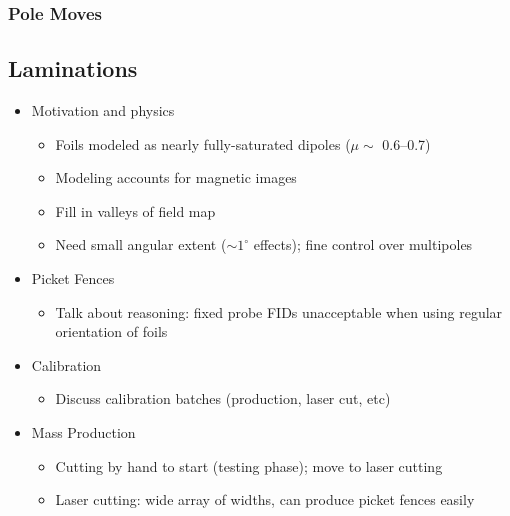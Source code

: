 \subsubsection{Pole Moves}

\subsection{Laminations}

\begin{itemize}
   \item Motivation and physics 
         \begin{itemize}
            \item Foils modeled as nearly fully-saturated dipoles ($\mu \sim$ 0.6--0.7) 
            \item Modeling accounts for magnetic images  
            \item Fill in valleys of field map 
            \item Need small angular extent ($\sim 1^{\circ}$ effects); fine control over multipoles 
         \end{itemize}  
   \item Picket Fences 
         \begin{itemize}
            \item Talk about reasoning: fixed probe FIDs unacceptable when 
                  using regular orientation of foils 
         \end{itemize} 
   \item Calibration 
         \begin{itemize} 
            \item Discuss calibration batches (production, laser cut, etc)  
         \end{itemize}
   \item Mass Production 
         \begin{itemize} 
            \item Cutting by hand to start (testing phase); move to laser cutting 
            \item Laser cutting: wide array of widths, can produce picket fences easily 

\end{itemize}
\end{itemize}
